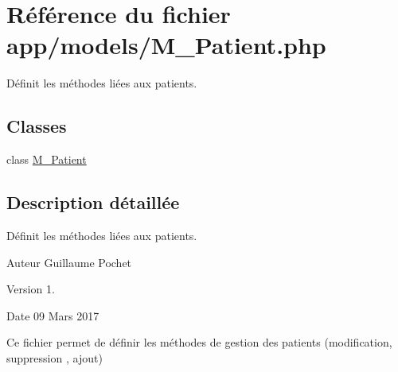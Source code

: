 \hypertarget{_m___patient_8php}{}\section{Référence du fichier app/models/\+M\+\_\+\+Patient.php}
\label{_m___patient_8php}


Définit les méthodes liées aux patients.  


\subsection*{Classes}
\begin{DoxyCompactItemize}
\item 
class \hyperlink{class_m___patient}{M\+\_\+\+Patient}
\end{DoxyCompactItemize}


\subsection{Description détaillée}
Définit les méthodes liées aux patients. 

\begin{DoxyAuthor}{Auteur}
Guillaume Pochet 
\end{DoxyAuthor}
\begin{DoxyVersion}{Version}
1. 
\end{DoxyVersion}
\begin{DoxyDate}{Date}
09 Mars 2017
\end{DoxyDate}
Ce fichier permet de définir les méthodes de gestion des patients (modification, suppression , ajout) 
